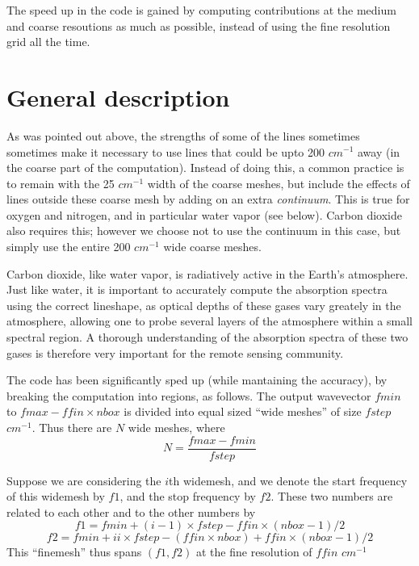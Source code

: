 \documentclass[11pt]{article}
\begin{document}
The speed up in the code is gained by computing contributions at the 
medium and coarse resoutions as much as possible, instead of using the 
fine resolution grid all the time.

\newpage
\section{General description}

As was pointed out above, the strengths of some of the lines sometimes
sometimes make it necessary to use lines that could be upto 200 $cm^{-1}$ 
away (in the coarse part of the computation). Instead of doing this, a 
common practice is to remain with the 25 $cm^{-1}$ width of the coarse 
meshes, but include the effects of lines outside these coarse mesh by adding
on an extra {\it continuum}. This is true for oxygen and nitrogen, and in
particular water vapor (see below). Carbon dioxide also requires this; 
however we choose not to use the continuum in this case, but simply use the
entire 200 $cm^{-1}$ wide coarse meshes.

Carbon dioxide, like water vapor, is radiatively active in the Earth's 
atmosphere. Just like water, it is important to accurately compute the
absorption spectra using the correct lineshape, as optical depths of these
gases vary greately in the atmosphere, allowing one to probe several 
layers of the atmosphere within a small spectral region. A thorough 
understanding of the absorption spectra of these two gases is therefore 
very important for the remote sensing community.

The code has been significantly sped up (while mantaining the accuracy), 
by breaking the computation into regions, as follows. The output wavevector 
$fmin$ to $fmax-ffin \times nbox$ is divided into equal sized ``wide meshes'' 
of size $fstep$ $cm^{-1}$. Thus there are $N$ wide meshes, where
\begin{equation}
N = \frac{fmax-fmin}{fstep}
\end{equation}

Suppose we are considering the $i$th  widemesh, and we denote the start 
frequency  of this widemesh by $f1$, and the stop frequency by $f2$. These 
two numbers are related to each other and to the other numbers by 
\begin{displaymath}
f1 = fmin + (i-1) \times fstep - ffin \times (nbox-1)/2 
\end{displaymath}
\begin{equation}
f2 = fmin + ii \times fstep - (ffin \times nbox) + ffin \times (nbox-1)/2
\end{equation}
This ``finemesh'' thus spans $(f1,f2)$ at the fine resolution of 
$ffin$ $cm^{-1}$
\end{document}
